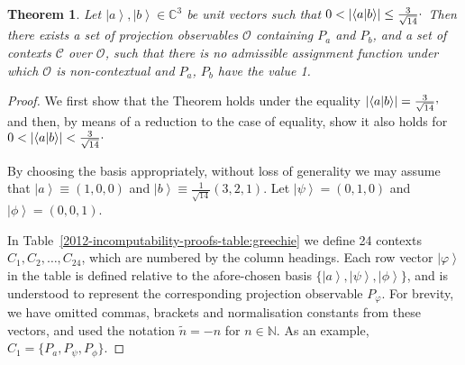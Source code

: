 \documentclass[%
 preprint,
 showpacs,
 showkeys,
 amsmath,
 amssymb,
 aps,
 pra,
 ]{revtex4-1}
\newtheorem{Theorem}{Theorem}
\theoremstyle{definition}
\newcommand{\ket}[1]{\left| #1 \right>}
\newcommand{\iprod}[2]{\langle #1 | #2 \rangle}
\newcommand{\m}[1]{\widetilde{#1}}
\begin{document}
\begin{Theorem}
\label{thm:twonotvaluedefinite}
	Let $\ket{a}, \ket{b}\in \mathbb{C}^3$ be unit vectors such that $0 < |\iprod{a}{b}| \le \frac{3}{\sqrt{14}}\raisebox{.8mm}{.}$
	Then there exists a set of projection observables $\mathcal{O}$ containing $P_a$ and $P_b$, and a set of contexts $\mathcal{C}$ over $\mathcal{O}$, such that there is no admissible assignment function under which $\mathcal{O}$ is non-contextual and $P_a$, $P_b$ have the value 1.
\end{Theorem}
\begin{proof}
	We first show that the Theorem holds under the equality $|\iprod{a}{b}|=\frac{3}{\sqrt{14}}\raisebox{.8mm}{,}$ and then, by means of a reduction to the case of equality, show it also holds for $0<|\iprod{a}{b}|<\frac{3}{\sqrt{14}}\raisebox{.8mm}{.}$

	By choosing the basis appropriately, without loss of generality we may assume that $\ket{a}\equiv(1,0,0)$ and $\ket{b}\equiv\frac{1}{\sqrt{14}}(3,2,1)$.
	Let $\ket{\psi}=(0,1,0)$ and $\ket{\phi}=(0,0,1)$.
	
	In Table~\ref{2012-incomputability-proofs-table:greechie} we define 24 contexts $C_1, C_2, \dots, C_{24}$, which are numbered by the column headings.
	Each row vector $\ket{\varphi}$ in the table is defined relative to the afore-chosen basis $\{ \ket{a}, \ket{\psi}, \ket{\phi} \}$, and is understood to represent the corresponding projection observable $P_\varphi$.
	For brevity, we have omitted commas, brackets and normalisation constants from these vectors, and used the notation $\m{n} = -n$ for $n \in \mathbb{N}$.
	As an example, $C_1 = \{ P_a, P_\psi, P_\phi \}$.
	

\end{proof}
\end{document}
